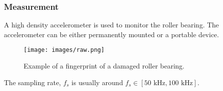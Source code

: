\begin{frame}
    \frametitle{Measurement}
    \small
    A high density accelerometer is used to monitor the roller bearing.  The accelerometer can be either permanently mounted or a portable device.
    \begin{figure}
        \centering
        \texttt{[image: images/raw.png]}
        \caption{Example of a fingerprint of a damaged roller bearing.}
        \label{fig:raw}
    \end{figure}
    The sampling rate, $f_s$ is usually around $f_s \in [50\text{ kHz}, 100\text{ kHz}]$.
   
\end{frame}